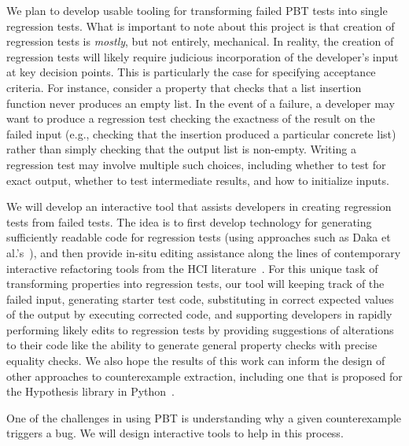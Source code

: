 We plan to develop usable tooling for transforming failed PBT tests into single
regression tests. What is important to note about this project is that creation
of regression tests is \emph{mostly}, but not entirely, mechanical. In reality,
the creation of regression tests will likely require judicious incorporation of
the developer's input at key decision points. This is particularly the case for
specifying acceptance criteria. For instance, consider a property that checks
that a list insertion function never produces an empty list. In the event of a
failure, a developer may want to produce a regression test checking the
exactness of the result on the failed input (e.g., checking that the insertion
produced a particular concrete list) rather than simply checking that the output
list is non-empty.  Writing a regression test may involve multiple such
choices, including whether to test for exact output, whether to test
intermediate results, and how to initialize inputs.

We will develop an interactive tool that assists developers in creating
regression tests from failed tests. The idea is to first develop
technology for generating sufficiently readable code for regression tests (using
approaches such as Daka et al.'s~\cite{ref:daka2015modeling}), and then provide
in-situ editing assistance along the lines of contemporary interactive
refactoring tools from the HCI
literature~\cite{ref:head2018interactive,ref:barik2016quick,ref:murphyhill2008refactoring,ref:lee2013draganddrop}.
For this unique task of transforming properties into regression tests,
our tool will \iflater{}\fi keeping track of the failed input,
generating starter test code, substituting in correct expected values of the
output by executing corrected code, and supporting developers in rapidly
performing likely edits to regression tests by providing suggestions of
alterations to their code like the ability to generate general property checks
with precise equality checks\iflater{}\fi. We also hope the results of this work
can inform the
design of other approaches to counterexample extraction, including one that is
proposed for the Hypothesis library in Python~\cite{maciver2019hypothesis}.


%
One of the challenges in using PBT is understanding why
a given counterexample triggers a bug.  We will design interactive
tools to help in this process.

